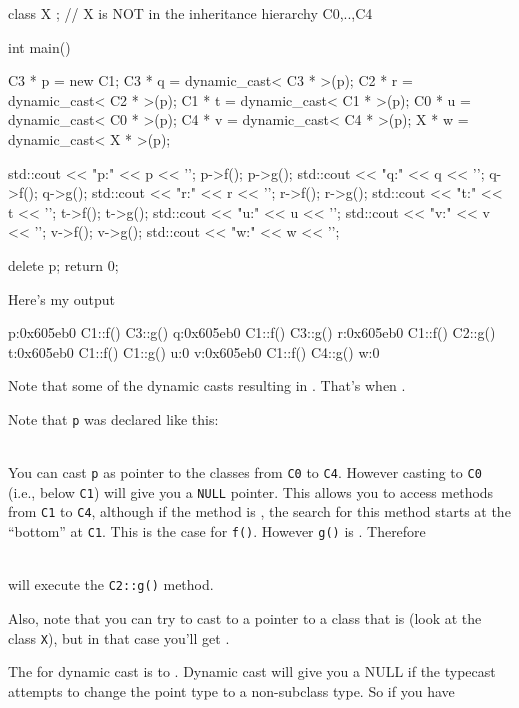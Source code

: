 \begin{consolethree}[escapeinside=||]
\begin{console}
class X {}; // X is NOT in the inheritance hierarchy C0,..,C4

int main()
{   
    C3 * p = new C1;
    C3 * q = dynamic_cast< C3 * >(p);
    C2 * r = dynamic_cast< C2 * >(p);
    C1 * t = dynamic_cast< C1 * >(p);
    C0 * u = dynamic_cast< C0 * >(p);
    C4 * v = dynamic_cast< C4 * >(p);
    X * w = dynamic_cast< X * >(p);
    
    std::cout << "p:" << p << '\n'; p->f(); p->g();
    std::cout << "q:" << q << '\n'; q->f(); q->g();
    std::cout << "r:" << r << '\n'; r->f(); r->g();
    std::cout << "t:" << t << '\n'; t->f(); t->g();
    std::cout << "u:" << u << '\n';
    std::cout << "v:" << v << '\n'; v->f(); v->g();
    std::cout << "w:" << w << '\n';

    delete p;
    return 0;
}
\end{console}

Here's my output

\begin{console}
p:0x605eb0
C1::f()
C3::g()
q:0x605eb0
C1::f()
C3::g()
r:0x605eb0
C1::f()
C2::g()
t:0x605eb0
C1::f()
C1::g()
u:0
v:0x605eb0
C1::f()
C4::g()
w:0
\end{console}

Note that some of the dynamic casts resulting in
\texttt{}. That's when .

Note that \texttt{p} was declared like this:

\\

You can cast \texttt{p} as pointer to the classes from \texttt{C0} to \texttt{C4}. However casting to \texttt{C0 }(i.e., below \texttt{C1}) will give you a \texttt{NULL} pointer. This allows you to access methods from \texttt{C1} to \texttt{C4}, although if the method is , the search for this method starts at the ``bottom'' at \texttt{C1}. This is the case for \texttt{f()}. However \texttt{g()} is . Therefore

\\

will execute the \texttt{C2::g()} method.

Also, note that you can try to cast to a pointer to a class that is  (look at the class \texttt{X}), but in that case you'll get \texttt{}.

The  for dynamic cast is to . Dynamic cast will give you a NULL if the typecast attempts to change the point type to a non-subclass type. So if you have


\end{consolethree}
